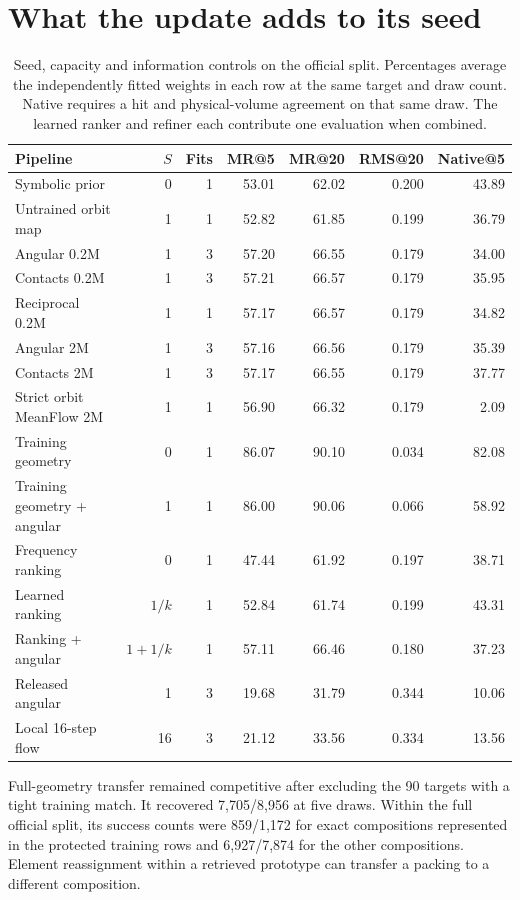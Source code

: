 \section{What the update adds to its seed}

\begin{table}[!htbp]\centering\small\setlength{\tabcolsep}{3.6pt}
\caption{Seed, capacity and information controls on the official split. Percentages average the independently fitted weights in each row at the same target and draw count. Native requires a hit and physical-volume agreement on that same draw. The learned ranker and refiner each contribute one evaluation when combined.}\label{tab:control}
\begin{tabular}{lrrrrrr}\hline
Pipeline & $S$ & Fits & MR@5 & MR@20 & RMS@20 & Native@5\\\hline
Symbolic prior & 0 & 1 & 53.01 & 62.02 & 0.200 & 43.89\\
Untrained orbit map & 1 & 1 & 52.82 & 61.85 & 0.199 & 36.79\\
Angular 0.2M & 1 & 3 & 57.20 & 66.55 & 0.179 & 34.00\\
Contacts 0.2M & 1 & 3 & 57.21 & 66.57 & 0.179 & 35.95\\
Reciprocal 0.2M & 1 & 1 & 57.17 & 66.57 & 0.179 & 34.82\\
Angular 2M & 1 & 3 & 57.16 & 66.56 & 0.179 & 35.39\\
Contacts 2M & 1 & 3 & 57.17 & 66.55 & 0.179 & 37.77\\
Strict orbit MeanFlow 2M & 1 & 1 & 56.90 & 66.32 & 0.179 & 2.09\\
Training geometry & 0 & 1 & 86.07 & 90.10 & 0.034 & 82.08\\
Training geometry + angular & 1 & 1 & 86.00 & 90.06 & 0.066 & 58.92\\
Frequency ranking & 0 & 1 & 47.44 & 61.92 & 0.197 & 38.71\\
Learned ranking & $1/k$ & 1 & 52.84 & 61.74 & 0.199 & 43.31\\
Ranking + angular & $1+1/k$ & 1 & 57.11 & 66.46 & 0.180 & 37.23\\
Released angular & 1 & 3 & 19.68 & 31.79 & 0.344 & 10.06\\
Local 16-step flow & 16 & 3 & 21.12 & 33.56 & 0.334 & 13.56\\
\hline\end{tabular}\end{table}

Full-geometry transfer remained competitive after excluding the 90 targets with a tight training match. It recovered 7,705/8,956 at five draws. Within the full official split, its success counts were 859/1,172 for exact compositions represented in the protected training rows and 6,927/7,874 for the other compositions. Element reassignment within a retrieved prototype can transfer a packing to a different composition.

